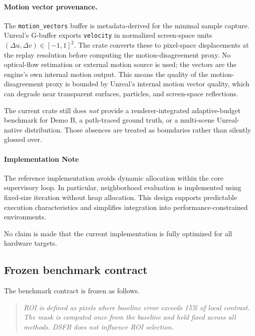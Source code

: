 \documentclass[11pt,letterpaper]{article}
\theoremstyle{gcresult}
\theoremstyle{definition}
\begin{document}
\paragraph{Motion vector provenance.}
The \texttt{motion\_vectors} buffer is metadata-derived for the minimal sample capture. Unreal's G-buffer exports \texttt{velocity} in normalized screen-space units $(\Delta u, \Delta v) \in [-1, 1]^2$. The crate converts these to pixel-space displacements at the replay resolution before computing the motion-disagreement proxy. No optical-flow estimation or external motion source is used; the vectors are the engine's own internal motion output. This means the quality of the motion-disagreement proxy is bounded by Unreal's internal motion vector quality, which can degrade near transparent surfaces, particles, and screen-space reflections.

The current crate still does \emph{not} provide a renderer-integrated adaptive-budget benchmark for Demo B, a path-traced ground truth, or a multi-scene Unreal-native distribution. Those absences are treated as boundaries rather than silently glossed over.


\paragraph{Implementation Note}

The reference implementation avoids dynamic allocation within the core supervisory loop. In particular, neighborhood evaluation is implemented using fixed-size iteration without heap allocation. This design supports predictable execution characteristics and simplifies integration into performance-constrained environments.

No claim is made that the current implementation is fully optimized for all hardware targets.

\subsection{Frozen benchmark contract}

The benchmark contract is frozen as follows.

\begin{quote}
\emph{ROI is defined as pixels where baseline error exceeds 15\% of local contrast. The mask is computed once from the baseline and held fixed across all methods. DSFB does not influence ROI selection.}
\end{quote}
\end{document}
